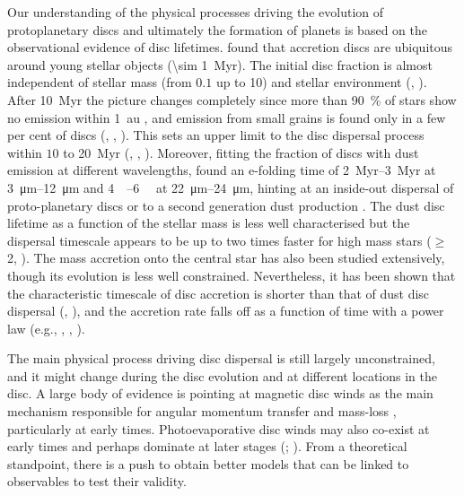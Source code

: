 \documentclass[usenatbib,useAMS,usedcolumn]{mnras}
\begin{document}
Our understanding of the physical processes driving the evolution of protoplanetary discs and ultimately the formation of planets is based on the observational evidence of disc lifetimes.
 found that accretion discs are ubiquitous around young stellar objects (\SI{\sim 1}{Myr}). The initial disc fraction is almost independent of stellar mass (from $0.1$ up to \SI{10}{\solarmass}) and stellar environment (, ).
After \SI{10}{Myr} the picture changes completely since more than \SI{90}{\percent} of stars show no emission within \SI{1}{\astronomicalunit} , and emission from small grains is found only in a few per cent of discs (, , ).
This sets an upper limit to the disc dispersal process within $10$ to \SI{20}{Myr} (, , ). Moreover, fitting the fraction of discs with dust emission at different wavelengths,  found an e-folding time of \SIrange{2}{3}{Myr} at \SIrange[]{3}{12}{\micro\meter} and \SIrange[]{4}{6}{\mega\year} at \SIrange[]{22}{24}{\micro\meter}, hinting at an inside-out dispersal of proto-planetary discs or to a second generation dust production .
The dust disc lifetime as a function of the stellar mass is less well characterised but the dispersal timescale appears to be up to two times faster for high mass stars ($\geq$ \SI{2}{\solarmass}, ).
The mass accretion onto the central star has also been studied extensively, though its evolution is less well constrained. Nevertheless, it has been shown that the characteristic timescale of disc accretion is shorter than that of dust disc dispersal (, ), and the accretion rate falls off as a function of time with a power law (e.g., , , ).

The main physical process driving disc dispersal is still largely unconstrained, and it might change during the disc evolution and at different locations in the disc. A large body of evidence is pointing at magnetic disc winds as the main mechanism responsible for angular momentum transfer and mass-loss , particularly at early times. Photoevaporative disc winds may also co-exist at early times and perhaps dominate at later stages (; ). From a theoretical standpoint, there is a push to obtain better models that can be linked to observables to test their validity.
\end{document}
